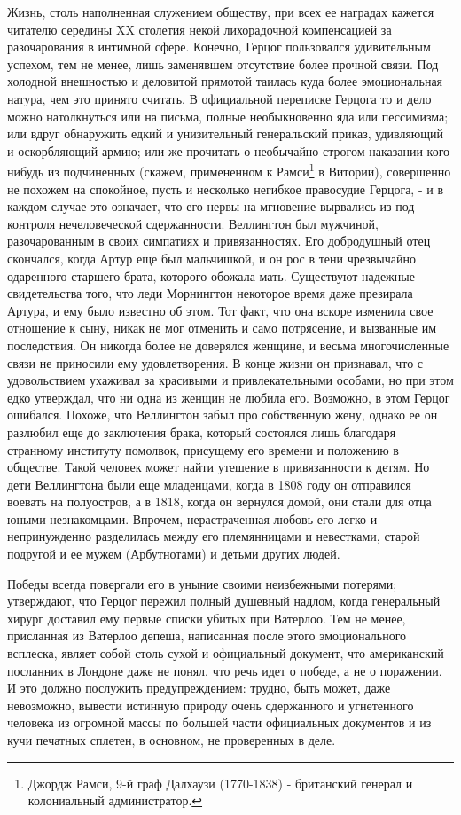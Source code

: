 \documentclass[
  oneside,
  12pt,
  titlepage]{book}
\begin{document}
Жизнь, столь наполненная служением обществу, при всех ее наградах кажется читателю середины XX столетия некой лихорадочной компенсацией за разочарования в интимной сфере. Конечно, Герцог пользовался удивительным успехом, тем не менее, лишь заменявшем отсутствие более прочной связи. Под холодной внешностью и деловитой прямотой таилась куда более эмоциональная натура, чем это принято считать. В официальной переписке Герцога то и дело можно натолкнуться или на письма, полные необыкновенно яда или пессимизма; или вдруг обнаружить едкий и унизительный генеральский приказ, удивляющий и оскорбляющий армию; или же прочитать о необычайно строгом наказании кого-нибудь из подчиненных (скажем, примененном к Рамси\footnote{Джордж Рамси, 9-й граф Далхаузи (1770-1838) - британский генерал и колониальный администратор.} в Витории), совершенно не похожем на спокойное, пусть и несколько негибкое правосудие Герцога, - и в каждом случае это означает, что его нервы на мгновение вырвались из-под контроля нечеловеческой сдержанности. Веллингтон был мужчиной, разочарованным в своих симпатиях и привязанностях. Его добродушный отец скончался, когда Артур еще был мальчишкой, и он рос в тени чрезвычайно одаренного старшего брата, которого обожала мать. Существуют надежные свидетельства того, что леди Морнингтон некоторое время даже презирала Артура, и ему было известно об этом. Тот факт, что она вскоре изменила свое отношение к сыну, никак не мог отменить и само потрясение, и вызванные им последствия. Он никогда более не доверялся женщине, и весьма многочисленные связи не приносили ему удовлетворения. В конце жизни он признавал, что с удовольствием ухаживал за красивыми и привлекательными особами, но при этом едко утверждал, что ни одна из женщин не любила его. Возможно, в этом Герцог ошибался. Похоже, что Веллингтон забыл про собственную жену, однако ее он разлюбил еще до заключения брака, который состоялся лишь благодаря странному институту помолвок, присущему его времени и положению в обществе. Такой человек может найти утешение в привязанности к детям. Но дети Веллингтона были еще младенцами, когда в 1808 году он отправился воевать на полуостров, а в 1818, когда он вернулся домой, они стали для отца юными незнакомцами. Впрочем, нерастраченная любовь его легко и непринужденно разделилась между его племянницами и невестками, старой подругой и ее мужем (Арбутнотами) и детьми других людей.

Победы всегда повергали его в уныние своими неизбежными потерями; утверждают, что Герцог пережил полный душевный надлом, когда генеральный хирург доставил ему первые списки убитых при Ватерлоо. Тем не менее, присланная из Ватерлоо депеша, написанная после этого эмоционального всплеска, являет собой столь сухой и официальный документ, что американский посланник в Лондоне даже не понял, что речь идет о победе, а не о поражении. И это должно послужить предупреждением: трудно, быть может, даже невозможно, вывести истинную природу очень сдержанного и угнетенного человека из огромной массы по большей части официальных документов и из кучи печатных сплетен, в основном, не проверенных в деле.
\end{document}
